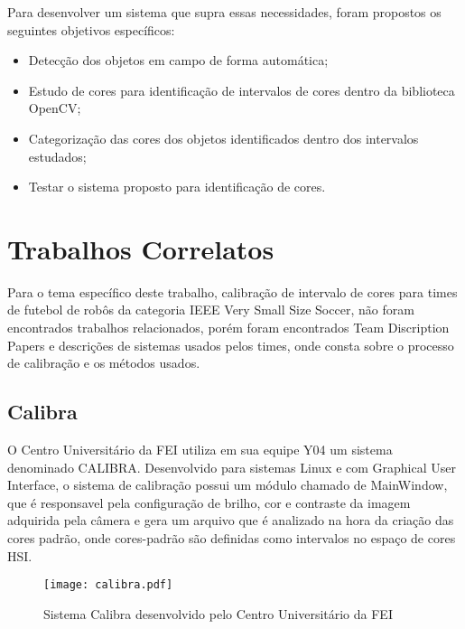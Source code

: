 Para desenvolver um sistema que supra essas necessidades, foram propostos os seguintes objetivos específicos:

\begin{itemize}
	
	\item Detecção dos objetos em campo de forma automática; 
	\item Estudo de cores para identificação de intervalos de cores dentro da biblioteca OpenCV;
	\item Categorização das cores dos objetos identificados dentro dos intervalos estudados;
	\item Testar o sistema proposto para identificação de cores.
	
	
\end{itemize}

\newpage

\section{Trabalhos Correlatos}
Para o tema específico deste trabalho, calibração de intervalo de cores para times de futebol de robôs da categoria IEEE Very Small Size Soccer, não foram encontrados trabalhos relacionados, porém foram encontrados Team Discription Papers e descrições de sistemas usados pelos times, onde consta sobre o processo de calibração e os métodos usados\cite{Penharbel:2004}\cite{Rosa:2015}\cite{VSSVision}\cite{PenharbelTime}.

\subsection{Calibra}
O Centro Universitário da FEI\cite{PenharbelTime} utiliza em sua equipe Y04 um sistema denominado CALIBRA\cite{Penharbel:2004}. Desenvolvido para sistemas Linux e com Graphical User Interface\cite{Penharbel:2004}, o sistema de calibração possui um módulo chamado de MainWindow, que é responsavel pela configuração de brilho, cor e contraste da imagem adquirida pela câmera e gera um arquivo que é analizado na hora da criação das cores padrão\cite{PenharbelTime}, onde cores-padrão são definidas como intervalos no espaço de cores HSI\cite{PenharbelTime}.
\begin{figure}[H]
	\centering
	\texttt{[image: calibra.pdf]}
	\caption{Sistema Calibra desenvolvido pelo Centro Universitário da FEI \cite{Penharbel:2004}}
	\label{Calibra}
\end{figure}


